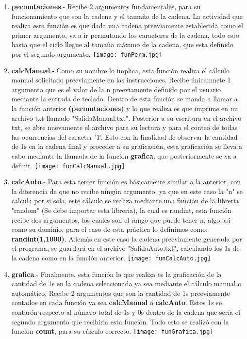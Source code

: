 \documentclass{article}
\begin{document}
 	\begin{enumerate}
 		\item {\bf permutaciones}.- Recibe 2 argumentos fundamentales, para su funcionamiento que son la cadena y el tamaño de la cadena. 
 		La actividad que realiza esta función es que dada una cadena preeviamente establecida como el primer argumento, va a ir permutando los caracteres de la cadena, todo esto hasta que el ciclo llegue al tamaño máximo de la cadena, que esta definido por el segundo argumento. 		
		\centering
	 	\texttt{[image: funPerm.jpg]}
	 		
 		\vspace{3cm}
 		
 		\item {\bf calcManual}.- Como su nombre lo implica, esta función realiza el cálculo manual solicitado preeviamente en las instrucciones. Recibe únicamnete 1 argumento que es el valor de la n preeviamente definido por el usuario mediante la entrada de teclado. 
 		Dentro de esta función se manda a llamar a la función anterior {\bf (permutaciones)} y lo que realiza es que imprime en un archivo txt llamado "SalidaManual.txt". Posterior a su escritura en el archivo txt, se abre nuevamente el archivo para su lectura y para el conteo de todas las ocurrencias del caracter '1'. Esto con la finalidad de observar la cantidad de 1s en la cadena final y proceder a su graficación, esta graficación se lleva a cabo mediante la llamada de la función {\bf grafica}, que posteriormente se va a definir. 		
 		\centering
 		\texttt{[image: funCalcManual.jpg]}
 
 		\item {\bf calcAuto}.- Para esta tercer función es básicamente similar a la anterior, con la diferencia de que no recibe ningún argumento, ya que en este caso la "n" se calcula por si sola, este cálculo se realiza mediante una función de la libreria "random" (Se debe importar esta libreria), la cual es randint, esta función recibe dos argumentos, los cuales son el rango que puede tener n, algo asi como su dominio, para el caso de esta práctica lo definimos como: {\bf randint(1,1000)}.
 		Además en este caso la cadena preeviamente generada por el programa, se guardará en el archivo "SalidaAuto.txt", calculando los 1s de la cadena como en la función anterior.
 		\centering
 		\texttt{[image: funCalcAuto.jpg]} 		

 		
 		\item {\bf grafica}.- Finalmente, esta función lo que realiza es la graficación de la cantidad de 1s en la cadena seleccionada ya sea mediante el cálculo manual o automático. Recibe 2 argumentos que son la cantidad de 1s preeviamente contados en cada función ya sea {\bf calcManual} ó {\bf calcAuto}. Estos 1s se contarón respecto al número total de 1s y 0s dentro de la cadena que sería el segundo argumento que recibiria esta función. Todo esto se realizó con la función {\bf count}, para su cálculo correcto. 		
 		\centering
 		\texttt{[image: funGrafica.jpg]}	

 		\vspace{2cm}
 	\end{enumerate}
 	
\end{document}
